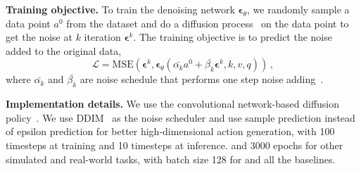 \textbf{Training objective.} To train the denoising network $\boldsymbol{\epsilon}_\theta$, we randomly sample a data point $a^0$ from the dataset and do a diffusion process~\citep{ho2020ddpm} on the data point to get the noise at $k$ iteration $\boldsymbol{\epsilon}^k$. The training objective is to predict the noise added to the original data,
\begin{equation}
\label{eq: loss}
\mathcal{L}=\text{MSE}\left(\boldsymbol{\epsilon}^k, \boldsymbol{\epsilon}_\theta(\bar{\alpha_k} a^0 + \bar{\beta_k} \boldsymbol{\epsilon}^k, k, v, q)\right)\,,
\end{equation}
where $\bar{\alpha_k}$ and $\bar{\beta_k}$ are noise schedule that performs one step noise adding~\citep{ho2020ddpm}. 




\textbf{Implementation details.} We use the convolutional network-based diffusion policy~\citep{chi2023diffusion_policy}.  We use DDIM~\citep{song2020ddim} as the noise scheduler and use sample prediction instead of epsilon prediction for better high-dimensional action generation, with  100 timesteps at training and 10 timesteps at inference.  and 3000 epochs for other simulated and real-world tasks, with batch size 128 for \ours and all the baselines.

